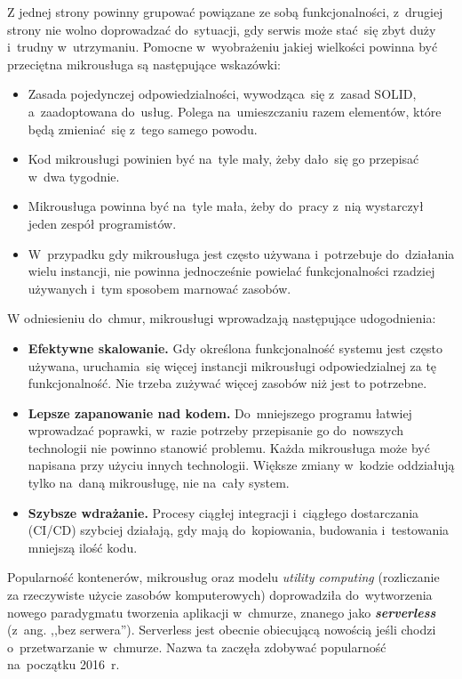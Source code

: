 \documentclass[12pt,a4paper,twoside,titlepage,openright]{book}
\begin{document}
Z jednej strony powinny grupować powiązane ze sobą funkcjonalności, z~drugiej strony nie wolno doprowadzać do~sytuacji, gdy serwis może stać~się zbyt duży i~trudny w~utrzymaniu. Pomocne w~wyobrażeniu jakiej wielkości powinna być przeciętna mikrousługa są następujące wskazówki:
\begin{itemize}
\item Zasada pojedynczej odpowiedzialności, wywodząca~się z~zasad SOLID, a~zaadoptowana do~usług. Polega na~umieszczaniu razem elementów, które będą zmieniać~się z~tego samego powodu. \cite{microservicesWmii}
\item Kod mikrousługi powinien być na~tyle mały, żeby dało~się go przepisać w~dwa tygodnie. \cite{microservicesWmii}
\item Mikrousługa powinna być na~tyle mała, żeby do~pracy z~nią wystarczył jeden zespół programistów. \cite{microservicesSusan}
\item W~przypadku gdy mikrousługa jest często używana i~potrzebuje do~działania wielu instancji, nie powinna jednocześnie powielać funkcjonalności rzadziej używanych i~tym sposobem marnować zasobów. \cite{microservicesSusan}
\end{itemize}

W odniesieniu do~chmur, mikrousługi wprowadzają następujące udogodnienia: \cite{microservicesPacktNetCore, microservicesSusan, microservicesWmii}
\begin{itemize}
\item \textbf{Efektywne skalowanie.} Gdy określona funkcjonalność systemu jest często używana, uruchamia~się więcej instancji mikrousługi odpowiedzialnej za tę funkcjonalność. Nie trzeba zużywać więcej zasobów niż jest to potrzebne.
\item \textbf{Lepsze zapanowanie nad kodem.} Do~mniejszego programu łatwiej wprowadzać poprawki, w~razie potrzeby przepisanie go do~nowszych technologii nie powinno stanowić problemu. Każda mikrousługa może być napisana przy użyciu innych technologii. Większe zmiany w~kodzie oddziałują tylko na~daną mikrousługę, nie na~cały system.
\item \textbf{Szybsze wdrażanie.} Procesy ciągłej integracji i~ciągłego dostarczania (CI/CD) szybciej działają, gdy mają do~kopiowania, budowania i~testowania mniejszą ilość kodu. 
\end{itemize}

Popularność kontenerów, mikrousług oraz modelu \textit{utility computing} (rozliczanie za rzeczywiste użycie zasobów komputerowych) doprowadziła do~wytworzenia nowego paradygmatu tworzenia aplikacji w~chmurze, znanego jako \textbf{\textit{serverless}} (z~ang. ,,bez serwera''). Serverless jest obecnie obiecującą nowością jeśli chodzi o~przetwarzanie w~chmurze. Nazwa ta zaczęła zdobywać popularność na~początku 2016~r. \cite{ccResearchSpringer}  
\end{document}
